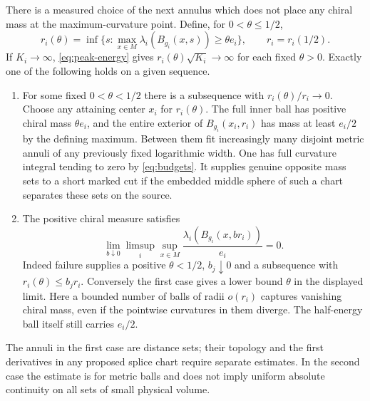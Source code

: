 There is a measured choice of the next annulus which does not
place any chiral mass at the maximum-curvature point. Define, for
\(0<\theta\le1/2\),
\[
 r_i(\theta)=\inf\{s:\max_{x\in M}\lambda_i(B_{g_i}(x,s))
                         \ge\theta e_i\},\qquad r_i=r_i(1/2).
\]
If \(K_i\to\infty\), \eqref{eq:peak-energy} gives
\(r_i(\theta)\sqrt{K_i}\to\infty\) for each fixed \(\theta>0\).
Exactly one of the following holds on a given sequence.
\begin{enumerate}
\item For some fixed \(0<\theta<1/2\) there is a subsequence with
\(r_i(\theta)/r_i\to0\). Choose any attaining center \(x_i\) for
\(r_i(\theta)\). The full inner ball has positive chiral mass
\(\theta e_i\), and the entire exterior of \(B_{g_i}(x_i,r_i)\)
has mass at least \(e_i/2\) by the defining maximum.
Between them fit increasingly many disjoint metric annuli of any
previously fixed logarithmic width. One has full curvature integral
tending to zero by \eqref{eq:budgets}. It supplies genuine opposite
mass sets to a short marked cut if the embedded middle sphere of
such a chart separates these sets on the source.
\item The positive chiral measure satisfies
\[
 \lim_{b\downarrow0}\limsup_i\sup_{x\in M}
       \frac{\lambda_i(B_{g_i}(x,b r_i))}{e_i}=0 .
\]
Indeed failure supplies a positive \(\theta<1/2\), \(b_j\downarrow0\)
and a subsequence with \(r_i(\theta)\le b_j r_i\). Conversely the
first case gives a lower bound \(\theta\) in the displayed limit.
Here a bounded number of balls of radii \(o(r_i)\) captures
vanishing chiral mass, even if the pointwise curvatures in them
diverge. The half-energy ball itself still carries \(e_i/2\).
\end{enumerate}
The annuli in the first case are distance sets; their topology and
the first derivatives in any proposed splice chart require separate
estimates. In the second case the estimate is for metric balls and
does not imply uniform absolute continuity on all sets of small
physical volume.
